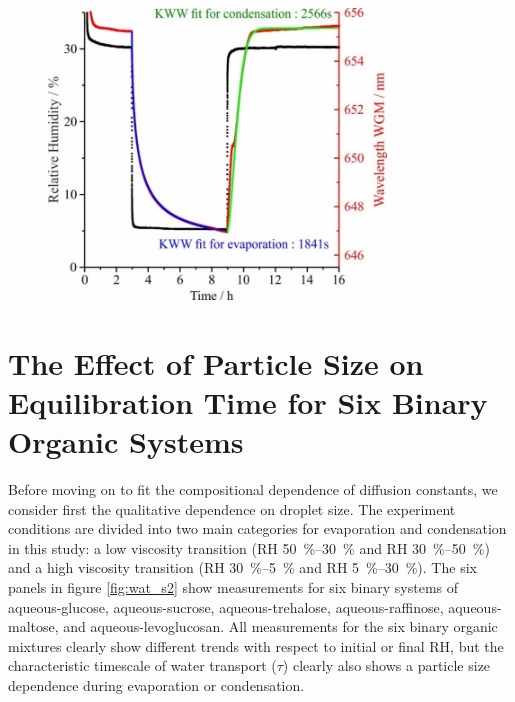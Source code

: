 \begin{figure}
    \centering
    \includegraphics[width=0.8\textwidth]{chapters/water_hopping/figures/image003.jpg}
    \label{fig:wat_s1}
\end{figure}

\section{The Effect of Particle Size on Equilibration Time for Six Binary Organic Systems}
Before moving on to fit the compositional dependence of diffusion constants, we consider first the qualitative dependence on droplet size. The experiment conditions are divided into two main categories for evaporation and condensation in this study: a low viscosity transition (RH \SIrange{50}{30}{\percent} and RH \SIrange{30}{50}{\percent}) and a high viscosity transition (RH \SIrange{30}{5}{\percent} and RH \SIrange{5}{30}{\percent}). The six panels in figure \ref{fig:wat_s2} show measurements for six binary systems of aqueous-glucose, aqueous-sucrose, aqueous-trehalose, aqueous-raffinose, aqueous-maltose, and aqueous-levoglucosan. All measurements for the six binary organic mixtures clearly show different trends with respect to initial or final RH, but the characteristic timescale of water transport ($\tau$) clearly also shows a particle size dependence during evaporation or condensation.


